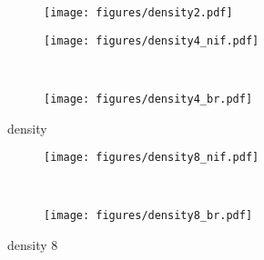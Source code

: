 \begin{figure}
	\centering
	\begin{subfigure}[t]{0.95\textwidth}
		\texttt{[image: figures/density2.pdf]}
	\end{subfigure}

	\begin{subfigure}[t]{0.48\textwidth}
		\texttt{[image: figures/density4\_nif.pdf]}
	\end{subfigure}
	~
	\begin{subfigure}[t]{0.48\textwidth}
		\texttt{[image: figures/density4\_br.pdf]}
	\end{subfigure}
	
	\caption{density}
	\label{}
\end{figure}

\begin{figure}
	\centering
	\begin{subfigure}[t]{0.48\textwidth}
		\texttt{[image: figures/density8\_nif.pdf]}
	\end{subfigure}
	~
	\begin{subfigure}[t]{0.48\textwidth}
		\texttt{[image: figures/density8\_br.pdf]}
	\end{subfigure}
	\caption{density 8}
	\label{}
\end{figure}